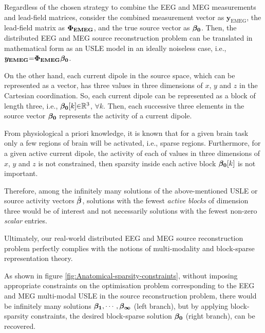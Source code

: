 Regardless of the chosen strategy to combine the EEG and MEG measurements and lead-field matrices, consider the combined measurement vector as $\boldsymbol{y_{\mathrm{EMEG}}}$, the lead-field matrix as $\boldsymbol{\Phi}_{\boldsymbol{\mathrm{EMEG}}}$, and the true source vector as $\boldsymbol{\beta}_{\boldsymbol{0}}$.
Then, the distributed EEG and MEG source reconstruction problem can be translated in mathematical form as an USLE model in an ideally noiseless case, i.e., $\boldsymbol{y_{\mathrm{EMEG}}} {=} \boldsymbol{\Phi}_{\boldsymbol{\mathrm{EMEG}}} \boldsymbol{\beta}_{\boldsymbol{0}}$.

On the other hand, each current dipole in the source space, which can be represented as a vector, has three values in three dimensions of $x$, $y$ and $z$ in the Cartesian coordination. 
So, each current dipole can be represented as a block of length three, i.e., $\boldsymbol{\beta}_{\boldsymbol{0}}[k] {\in} \mathbb{R}^3$, $\forall k$.
Then, each successive three elements in the source vector $\boldsymbol{\beta}_{\boldsymbol{0}}$ represents the activity of a current dipole.

From physiological a priori knowledge, it is known that for a given brain task only a few regions of brain will be activated, i.e., sparse regions.
Furthermore, for a given active current dipole, the activity of each of values in three dimensions of $x$, $y$ and $z$ is not constrained, then sparsity inside each active block $\boldsymbol{\beta}_{\boldsymbol{0}}[k]$ is not important.

Therefore, among the infinitely many solutions of the above-mentioned USLE or source activity vectors $\tilde{\boldsymbol{\beta}}$, solutions with the fewest \emph{active blocks} of dimension three would be of interest and not necessarily solutions with the fewest non-zero \emph{scalar} entries.

Ultimately, our real-world distributed EEG and MEG source reconstruction problem perfectly complies with the notions of multi-modality and block-sparse representation theory.

As shown in figure \ref{fig:Anatomical-sparsity-constraints}, without imposing appropriate constraints on the optimisation problem corresponding to the EEG and MEG multi-modal USLE in the source reconstruction problem, there would be infinitely many solutions $\boldsymbol{\beta}_{\boldsymbol{1}}, \cdots , \boldsymbol{\beta}_{\boldsymbol{\infty}}$ (left branch), but by applying block-sparsity constraints, the desired block-sparse solution $\boldsymbol{\beta}_{\boldsymbol{0}}$ (right branch), can be recovered.

